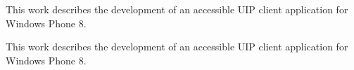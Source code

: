 \startAbstractCz
This work describes the development of an accessible UIP client application for Windows Phone 8.
\stopAbstractCz

\startAbstractEn
This work describes the development of an accessible UIP client application for Windows Phone 8.
\stopAbstractEn

\endinput
